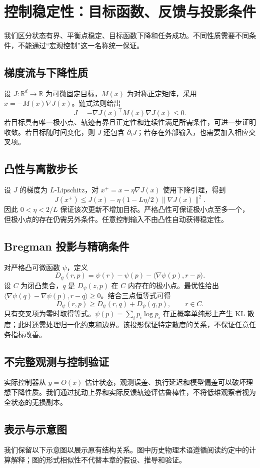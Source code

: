 \chapter{控制稳定性：目标函数、反馈与投影条件}
\label{chp:macro_stability_ig}
\label{sec:section_5895}
\label{sec:section_2277}
\label{sec:section_1708}
\label{sec:cognitive_impedance_least_action}
\label{sec:section_6743}
\label{sec:section_8007}
\label{sec:section_8643}
\label{sec:section_7154}
\label{sec:section_9649}

我们区分状态有界、平衡点稳定、目标函数下降和任务成功。不同性质需要不同条件，不能通过“宏观控制”这一名称统一保证。
\section{梯度流与下降性质}
设 $J:\mathbb R^d\to\mathbb R$ 为可微固定目标，$M(x)$ 为对称正定矩阵，采用 $\dot x=-M(x)\nabla J(x)$。链式法则给出
\begin{equation}\dot J=-\nabla J(x)^\top M(x)\nabla J(x)\le0.\end{equation}
若目标具有唯一极小点、轨迹有界且正定性和连续性满足所需条件，可进一步证明收敛。若目标随时间变化，则 $\dot J$ 还包含 $\partial_tJ$；若存在外部输入，也需要加入相应交叉项。
\section{凸性与离散步长}
设 $J$ 的梯度为 $L$-Lipschitz，对 $x^+=x-\eta\nabla J(x)$ 使用下降引理，得到
\begin{equation}J(x^+)\le J(x)-\eta(1-L\eta/2)\|\nabla J(x)\|^2.\end{equation}
因此 $0<\eta<2/L$ 保证该次更新不增加目标。严格凸性可保证极小点至多一个，但极小点的存在仍需另外条件。任意控制输入不由凸性自动获得稳定性。
\section{Bregman 投影与精确条件}
对严格凸可微函数 $\psi$，定义
\begin{equation}D_\psi(r,p)=\psi(r)-\psi(p)-\langle\nabla\psi(p),r-p\rangle.\end{equation}
设 $C$ 为闭凸集合，$q$ 是 $D_\psi(z,p)$ 在 $C$ 内存在的极小点。最优性给出 $\langle\nabla\psi(q)-\nabla\psi(p),r-q\rangle\ge0$。结合三点恒等式可得
\begin{equation}D_\psi(r,p)\ge D_\psi(r,q)+D_\psi(q,p),\qquad r\in C.\end{equation}
只有交叉项为零时取得等式。$\psi(p)=\sum_i p_i\log p_i$ 在正概率单纯形上产生 KL 散度；此时还需处理归一化约束和边界。该投影保证特定散度的关系，不保证任意任务指标改善。
\section{不完整观测与控制验证}
实际控制器从 $y=O(x)$ 估计状态，观测误差、执行延迟和模型偏差可以破坏理想下降性质。我们通过扰动上界和实际反馈轨迹评估鲁棒性，不将低维观察者视为全状态的无损副本。

\section{表示与示意图}
我们保留以下示意图以展示原有结构关系。图中历史物理术语遵循阅读约定中的计算解释；图的形式相似性不代替本章的假设、推导和验证。

